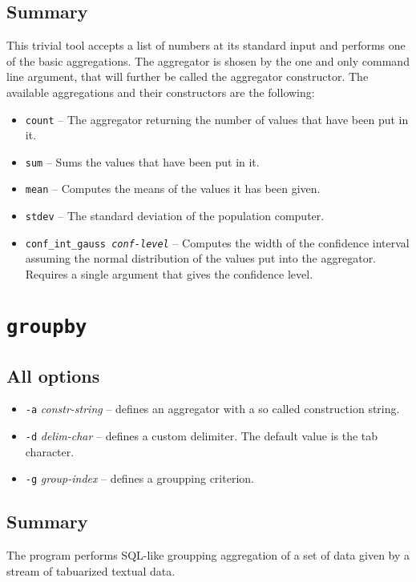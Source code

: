 \documentclass{report}
\begin{document}
\subsection{Summary}
This trivial tool accepts a list of numbers at its standard input and performs 
one of the basic aggregations. The aggregator is shosen by the one and only
command line argument, that will further be called the aggregator constructor.
The available aggregations and their constructors are the following:
\begin{itemize}
	\item \texttt{count} -- The aggregator returning the number of values
		that have been put in it.
	\item \texttt{sum} -- Sums the values that have been put in it.
	\item \texttt{mean} -- Computes the means of the values it has been
		given.
	\item \texttt{stdev} -- The standard deviation of the population
		computer.
	\item \texttt{conf\_int\_gauss \textit{conf-level}} -- Computes
		the width of the confidence interval assuming the normal
		distribution of the values put into the aggregator.
		Requires a single argument that gives the confidence
		level.
\end{itemize}

\section{\texttt{groupby}}

\subsection{All options}
\begin{itemize}
	\item \texttt{-a} \textit{constr-string} -- defines an aggregator with a
		so called construction string.
	\item \texttt{-d} \textit{delim-char} -- defines a custom delimiter.
		The default value is the tab character.
	\item \texttt{-g} \textit{group-index} -- defines a groupping criterion.
\end{itemize}

\subsection{Summary}
The program performs SQL-like groupping aggregation of a set of data given by a
stream of tabuarized textual data.
\end{document}

